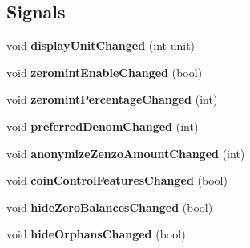 \subsection*{Signals}
\begin{DoxyCompactItemize}
\item 
\mbox{\label{class_options_model_a7827a9cf0ceea0a429522974b620f11e}} 
void {\bfseries display\+Unit\+Changed} (int unit)
\item 
\mbox{\label{class_options_model_a46029511a8b1b75f808032fb75087d12}} 
void {\bfseries zeromint\+Enable\+Changed} (bool)
\item 
\mbox{\label{class_options_model_a19d8be171794c6d0628f627567250d2c}} 
void {\bfseries zeromint\+Percentage\+Changed} (int)
\item 
\mbox{\label{class_options_model_aecaf3c519b7860fe4a69c55575156f1a}} 
void {\bfseries preferred\+Denom\+Changed} (int)
\item 
\mbox{\label{class_options_model_ae43392c54879ffabd7eb217e31b02438}} 
void {\bfseries anonymize\+Zenzo\+Amount\+Changed} (int)
\item 
\mbox{\label{class_options_model_a469ef5e28f59f5b633a2f17943527389}} 
void {\bfseries coin\+Control\+Features\+Changed} (bool)
\item 
\mbox{\label{class_options_model_a20f8213ad32bc9dd45a37a9ca7463736}} 
void {\bfseries hide\+Zero\+Balances\+Changed} (bool)
\item 
\mbox{\label{class_options_model_a2a7570094cd4e24bc6605df7f7ff736a}} 
void {\bfseries hide\+Orphans\+Changed} (bool)
\end{DoxyCompactItemize}
